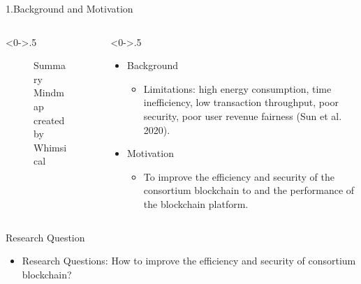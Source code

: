 \documentclass{beamer}
\begin{document}
	    \begin{frame}{1.Background and Motivation}
 
		\begin{columns}[T]
			\begin{column}<0->{.5\textwidth}
				\begin{figure}[thpb]
					\centering
					\caption{Summary Mindmap created by Whimsical}
					\label{fig:1}
				\end{figure}
			\end{column}%
			\hfill%
			\begin{column}<0->{.5\textwidth}
				\begin{itemize}
					\item<1-> Background
					\begin{itemize}
						\item<1-> Limitations: high energy consumption, time inefficiency, low transaction throughput, poor security, poor user revenue fairness (Sun et al. 2020).
					\end{itemize}
					\item<2-> Motivation
					\begin{itemize}
						\item<2-> To  improve the efficiency and security of the consortium blockchain to and the performance of the blockchain platform.
					\end{itemize}
				\end{itemize}
			\end{column}
		\end{columns}
	\end{frame}
		    \begin{frame}{Research Question}
			    \begin{itemize} 
			    \item  Research Questions: How to improve the efficiency and security of consortium blockchain?
			    \end{itemize}
		    \end{frame}
\end{document}
